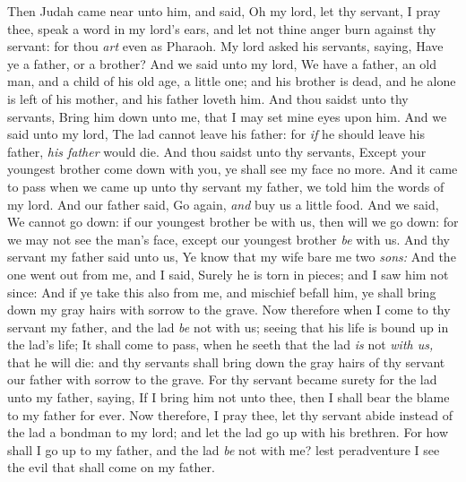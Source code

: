 \documentclass[11pt,letterpaper,oneside]{memoir}
\begin{document}
Then Judah came near unto him, and said, Oh my lord, let thy servant, I
pray thee, speak a word in my lord's ears, and let not thine anger burn
against thy servant: for thou \emph{art} even as Pharaoh. My lord asked
his servants, saying, Have ye a father, or a brother? And we said unto
my lord, We have a father, an old man, and a child of his old age, a
little one; and his brother is dead, and he alone is left of his mother,
and his father loveth him. And thou saidst unto thy servants, Bring him
down unto me, that I may set mine eyes upon him. And we said unto my
lord, The lad cannot leave his father: for \emph{if} he should leave his
father, \emph{his father} would die. And thou saidst unto thy servants,
Except your youngest brother come down with you, ye shall see my face no
more. And it came to pass when we came up unto thy servant my father, we
told him the words of my lord. And our father said, Go again, \emph{and}
buy us a little food. And we said, We cannot go down: if our youngest
brother be with us, then will we go down: for we may not see the man's
face, except our youngest brother \emph{be} with us. And thy servant my
father said unto us, Ye know that my wife bare me two \emph{sons: }And
the one went out from me, and I said, Surely he is torn in pieces; and I
saw him not since: And if ye take this also from me, and mischief befall
him, ye shall bring down my gray hairs with sorrow to the grave. Now
therefore when I come to thy servant my father, and the lad \emph{be}
not with us; seeing that his life is bound up in the lad's life; It
shall come to pass, when he seeth that the lad \emph{is} not \emph{with
us,} that he will die: and thy servants shall bring down the gray hairs
of thy servant our father with sorrow to the grave. For thy servant
became surety for the lad unto my father, saying, If I bring him not
unto thee, then I shall bear the blame to my father for ever. Now
therefore, I pray thee, let thy servant abide instead of the lad a
bondman to my lord; and let the lad go up with his brethren. For how
shall I go up to my father, and the lad \emph{be} not with me? lest
peradventure I see the evil that shall come on my father.
\end{document}
